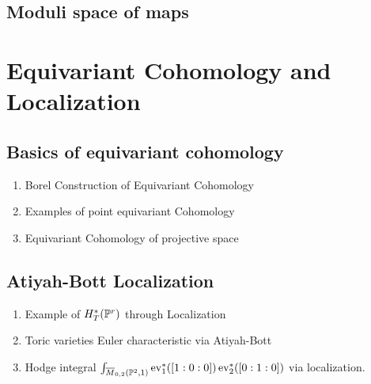 \documentclass[12pt]{memoir}
\begin{document}
\section{Moduli space of maps}

\chapter{Equivariant Cohomology and Localization}

\section{Basics of equivariant cohomology}
\begin{enumerate}
    \item Borel Construction of Equivariant Cohomology
    \item Examples of point equivariant Cohomology
    \item Equivariant Cohomology of projective space
\end{enumerate}

\section{Atiyah-Bott Localization}

\begin{enumerate}
    \item Example of $H^\ast_T(\mathbb{P}^r)$ through Localization
    \item Toric varieties Euler characteristic via Atiyah-Bott
    \item Hodge integral $\int_{\overline M_{0,2}(\mathbb{P}^2,1)}\operatorname{ev}_1^\ast([1:0:0])\operatorname{ev}_2^\ast([0:1:0])$ via localization.
\end{enumerate}

\ifx\nextra\undefined
\printindex
\else\fi
\nocite{*}


\end{document}
